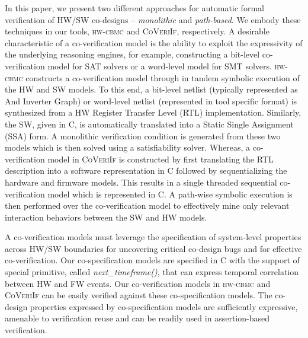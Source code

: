 \documentclass[sigconf]{acmart}
\newcommand{\tool}[1]{\textsc{#1}\xspace}
\newcommand{\hwcbmcv}{\tool{hw-cbmc}}
\newcommand{\verifox}{\tool{CoVeriIf}}
\begin{document}
In this paper, we present two different approaches for automatic formal
verification of HW/SW co-designs -- \emph{monolithic} and \emph{path-based}.  
We embody these techniques in our tools, \hwcbmcv and \verifox, respectively. 
A desirable characteristic of a co-verification model is the ability to exploit 
the expressivity of the underlying reasoning engines, for example, constructing 
a bit-level co-verification model for SAT solvers or a word-level model for SMT 
solvers.  \hwcbmcv constructs a co-verification model through 
in tandem symbolic execution of the HW and SW models.  To this end, a bit-level 
netlist (typically represented as And Inverter Graph) or word-level netlist 
(represented in tool specific format) is synthesized from a HW Register Transfer 
Level (RTL) implementation. Similarly, the SW, given in C, is automatically 
translated into a Static Single Assignment (SSA) form.  A monolithic verification 
condition is generated from these two models which is then solved using a 
satisfiability solver.  Whereas, a co-verification model in \verifox is constructed 
by first translating the RTL description into a software representation in C followed 
by sequentializing the hardware and firmware models.  This results in a single
threaded sequential co-verification model which is represented in C. A path-wise 
symbolic execution is then performed over the co-verification model to
effectively mine only relevant interaction behaviors between the SW and HW
models.   

A co-verification models must leverage the specification of system-level 
properties across HW/SW boundaries for uncovering critical co-design bugs 
and for effective co-verification.  Our co-specification models are 
specified in C with the support of special primitive, called {\em next\_timeframe()}, 
that can express temporal correlation between HW and FW events. Our
co-verification models in \hwcbmcv and \verifox can be easily verified against 
these co-specification models. The co-design properties expressed by 
co-specification models are sufficiently expressive, amenable to 
verification reuse and can be readily used in assertion-based verification.  
\end{document}
